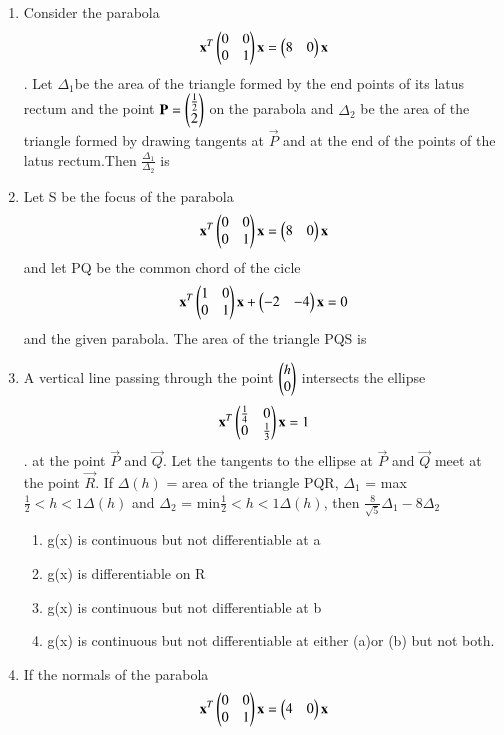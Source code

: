 \begin{enumerate}[label=\arabic*.,ref=\thesubsection.\theenumi]
    \item Consider the parabola
    \begin{align}
    \mathbf{x}^T\begin{pmatrix}0&0\\0&1\end{pmatrix}\mathbf{x}=\begin{pmatrix}8&0\end{pmatrix}\mathbf{x}
    \end{align}. Let $\Delta_1$be the area of the triangle formed by the end points of its latus rectum and the point $\mathbf{P}=\begin{pmatrix}\frac{1}{2}\\2\end{pmatrix}$ on the parabola and $\Delta_2$ be the area of the triangle formed by drawing tangents at $\vec{P}$ and at the end of the points of the latus rectum.Then $\frac{\Delta_1}{\Delta_2}$ is
   \item Let S be the focus of the parabola 
   \begin{align}
   \mathbf{x}^T\begin{pmatrix}0&0\\0&1\end{pmatrix}\mathbf{x}=\begin{pmatrix}8&0\end{pmatrix}\mathbf{x}
   \end{align} and let PQ be the common chord of the cicle 
   \begin{align}
   \mathbf{x}^T\begin{pmatrix}1&0\\0&1\end{pmatrix}\mathbf{x}+\begin{pmatrix}-2&-4\end{pmatrix}\mathbf{x}=0
   \end{align} and the given parabola. The area of the triangle PQS is
   \item A vertical line passing through the point $\begin{pmatrix}h\\0\end{pmatrix}$ intersects the ellipse
   \begin{align}
   \mathbf{x}^T\begin{pmatrix}\frac{1}{4}&0\\0&\frac{1}{3}\end{pmatrix}\mathbf{x}=1
   \end{align}. at the point $\vec{P}$ and $\vec{Q}$. Let the tangents to the ellipse at $\vec{P}$ and $\vec{Q}$ meet at the point $\vec{R}$. If $\Delta(h)$ = area of the triangle PQR, $\Delta_1$ = max $\frac{1}{2}<h<1 \Delta(h)$ and $\Delta_2$ = min$\frac{1}{2}<h<1 \Delta(h)$, then $\frac{8}{\sqrt{5}}\Delta_1-8\Delta_2$
    \begin{enumerate}
    \item g(x) is continuous but not differentiable at a
    \item g(x) is  differentiable on R
    \item g(x) is continuous but not differentiable at b
    \item g(x) is continuous but not differentiable at either (a)or (b) but not both.
    \end{enumerate}
    \item If the normals of the parabola
    \begin{align}
    \vec{x}^T\myvec{0&0\\0&1}\vec{x}=\myvec{4&0}\vec{x}

\end{align}
\end{enumerate}
